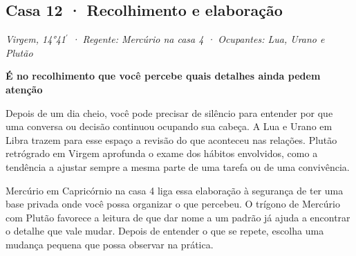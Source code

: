 \documentclass[11pt,a4paper]{article}
\newcommand{\leitura}[3]{\subsection{#1}\textit{#2}\par #3}
\newcommand{\subtituloleitura}[1]{\textbf{#1}\par\nopagebreak[4]}
\begin{document}
\leitura{Casa 12 · Recolhimento e elaboração}{Virgem, 14°41\ensuremath{^{\prime}} · Regente: Mercúrio na casa 4 · Ocupantes: Lua, Urano e Plutão}{
\subtituloleitura{É no recolhimento que você percebe quais detalhes ainda pedem atenção}
Depois de um dia cheio, você pode precisar de silêncio para entender por que uma conversa ou decisão continuou ocupando sua cabeça. A Lua e Urano em Libra trazem para esse espaço a revisão do que aconteceu nas relações. Plutão retrógrado em Virgem aprofunda o exame dos hábitos envolvidos, como a tendência a ajustar sempre a mesma parte de uma tarefa ou de uma convivência.

Mercúrio em Capricórnio na casa 4 liga essa elaboração à segurança de ter uma base privada onde você possa organizar o que percebeu. O trígono de Mercúrio com Plutão favorece a leitura de que dar nome a um padrão já ajuda a encontrar o detalhe que vale mudar. Depois de entender o que se repete, escolha uma mudança pequena que possa observar na prática.
}
\end{document}
